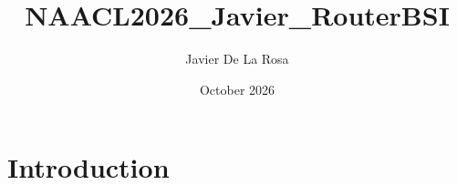 \documentclass{article}
\title{NAACL2026_Javier_RouterBSI}
\author{Javier De La Rosa}
\date{October 2026}
\begin{document}
\maketitle

\section{Introduction}
\end{document}
